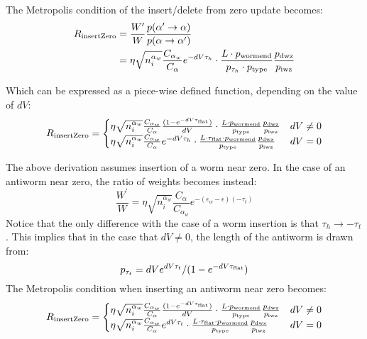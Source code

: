 \documentclass[12pt, two sided]{article}
\begin{document}
    The Metropolis condition of the insert/delete from zero update becomes:
    \begin{align}
    R_{\rm{insertZero}}  &= \frac{W^\prime }{W } \frac{p(\alpha^\prime \to \alpha)}{p(\alpha \to \alpha^\prime)} \nonumber \\
    &=   \eta \sqrt{n_i^{\alpha_w}} \frac{C_{\alpha_w}}{C_{\alpha}}e^{-dV \tau_h} \cdot \frac{L \cdot p_{\rm{wormend}}}{p_{\tau_h} \cdot p_{\rm{type}}} \frac{p_{\rm{dwz}}}{p_{\rm{iwz}}}
    \end{align}
    
    Which can be expressed as a piece-wise defined function, depending on the value of $dV$:
    \begin{equation}
    R_{\rm{insertZero}}  =
    \begin{cases}
\eta \sqrt{n_i^{\alpha_w}} \frac{C_{\alpha_w}}{C_{\alpha}} \frac{(1-e^{-dV\tau_{\rm{flat}}})}{dV} \cdot \frac{L \cdot p_{\rm{wormend}}}{p_{\rm{type}}} \frac{p_{\rm{dwz}}}{p_{\rm{iwz}}}& dV \neq 0 \\
\eta \sqrt{n_i^{\alpha_w}} \frac{C_{\alpha_w}}{C_{\alpha}}e^{-dV \tau_h} \cdot \frac{L \cdot \tau_{\rm{flat}} \cdot p_{\rm{wormend}}}{p_{\rm{type}}} \frac{p_{\rm{dwz}}}{p_{\rm{iwz}}} & dV = 0 \\
    \end{cases}
    \end{equation}
    
    The above derivation assumes insertion of a worm near zero. In the case of an antiworm near zero, the ratio of weights becomes instead:
    \begin{equation}
    \frac{W^\prime}{W}= \eta \sqrt{n_i^{\alpha_w}} \frac{C_{\alpha}}{C_{\alpha_w}}e^{-(\epsilon_w-\epsilon)(-\tau_t)}
    \end{equation}
    Notice that the only difference with the case of a worm insertion is that $\tau_h \to -\tau_t$. This implies that in the case that $dV\neq0$, the length of the antiworm is drawn from:
    \begin{equation}
    p_{\tau_t}=dV e^{dV\tau_t}/(1-e^{-dV \tau_{\rm{flat}}})
    \end{equation}
    The Metropolis condition when inserting an antiworm near zero becomes:
    \begin{equation}
    R_{\rm{insertZero}}  =
    \begin{cases}
\eta \sqrt{n_i^{\alpha_w}} \frac{C_{\alpha_w}}{C_{\alpha}} \frac{(1-e^{-dV\tau_{\rm{flat}}})}{dV} \cdot \frac{L \cdot p_{\rm{wormend}}}{p_{\rm{type}}} \frac{p_{\rm{dwz}}}{p_{\rm{iwz}}}& dV \neq 0 \\
\eta \sqrt{n_i^{\alpha_w}} \frac{C_{\alpha_w}}{C_{\alpha}}e^{dV \tau_t} \cdot \frac{L \cdot \tau_{\rm{flat}} \cdot p_{\rm{wormend}}}{p_{\rm{type}}} \frac{p_{\rm{dwz}}}{p_{\rm{iwz}}} & dV = 0 \\
    \end{cases}
    \end{equation}
    
\end{document}
